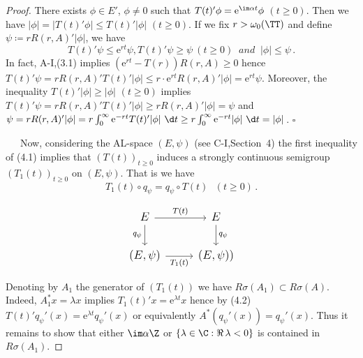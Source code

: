 \begin{proof}
	There exists $\phi \in E'$, $\phi \neq 0$ such that $T(t)'\phi = \mathrm{e}^{\im\alpha t}\phi$ $(t \geq 0)$. 
	Then we have $|\phi| = |T(t)'\phi| \leq T(t)'|\phi|$ $(t \geq 0)$.
	If we fix $r > \omega_0(\TT)$ and define $\psi \coloneqq  rR(r,A)'|\phi|$, we have
	\begin{equation}\label{eq:c3-4.1}
		T(t)'\psi \leq \mathrm{e}^{rt}\psi, T(t)'\psi \geq \psi \ (t \geq 0) \ \textit{ and } \ |\phi| \leq \psi\,.
	\end{equation}
%
	In fact, A-I,(3.1) implies $(\mathrm{e}^{rt} - T(r))R(r,A) \geq 0$ hence $T(t)'\psi = rR(r,A)'T(t)'|\phi| \leq r\cdot \mathrm{e}^{rt}R(r,A)'|\phi| = \mathrm{e}^{rt}\psi$.
	Moreover, the inequality $T(t)'|\phi| \geq |\phi|$ $(t \geq 0)$ implies $T(t)'\psi = rR(r,A)'T(t)'|\phi| \geq rR(r,A)'|\phi| = \psi$ and $\psi = rR(r,A)'|\phi| = r \int_{0}^{\infty} \mathrm{e}^{-rt}T(t)'|\phi|~\d t  \geq r\int_{0}^{\infty} \mathrm{e}^{-rt}|\phi|~\d t  = |\phi|$\,.
	$\square$
	
	\noindent
	\begin{minipage}{0.6\textwidth}
	\ \ \ Now, considering the AL-space $(E,\psi)$ (see C-I,Section~4) the first inequality of (4.1) implies that $(T(t))_{t \geq 0}$ induces a strongly continuous semigroup $(T_{1}(t))_{t \geq 0}$ on $(E,\psi)$.
	That is we have
	\begin{equation}\label{eq:c3-4.2}
		\textit{$T_{1}(t)\circ q_{\psi} = q_{\psi}\circ T(t)$ $(t \geq 0)$}\,.
	\end{equation}
	\end{minipage}
	\hfill
	\begin{minipage}{0.39\textwidth}
	\[\large
	\begin{tikzcd}
		E \arrow[r, "T(t)"] \arrow[d, "q_\psi"'] & E \arrow[d, "q_\psi"] \\
		(E,\psi) \arrow[r, "T_1(t)"'] & (E,\psi))
	\end{tikzcd}
	\]
	\end{minipage}
	Denoting by $A_{1}$ the generator of $(T_{1}(t))$ we have $R\sigma(A_{1}) \subset R\sigma(A)$.
	Indeed, $A_{1}^*x = \lambda x$ implies $T_{1}(t)'x = \mathrm{e}^{\lambda t}x$ hence by (4.2) $T(t)'q_{\psi}'(x) = \mathrm{e}^{\lambda t}q_{\psi}'(x)$ or equivalently $A^*(q_{\psi}'(x)) = q_{\psi}'(x)$. 
	Thus it remains to show that either $\im\alpha\Z$ or $\{\lambda \in \C  : \Re\,\lambda < 0 \}$ is contained in $R\sigma(A_{1})$. 
	

\end{proof}

